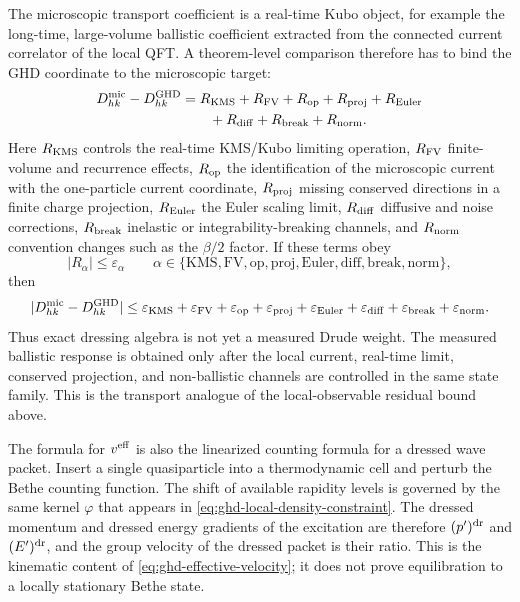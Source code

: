 \begin{remark}
The microscopic transport coefficient is a real-time Kubo object, for
example the long-time, large-volume ballistic coefficient extracted from the
connected current correlator of the local QFT.  A theorem-level comparison
therefore has to bind the GHD coordinate to the microscopic target:
\begin{equation}
\begin{aligned}
  D_{hk}^{\rm mic}-D_{hk}^{\rm GHD}
  &=
  R_{\rm KMS}
  +R_{\rm FV}
  +R_{\rm op}
  +R_{\rm proj}
  +R_{\rm Euler}  \\
  &\qquad
  +R_{\rm diff}
  +R_{\rm break}
  +R_{\rm norm}.
\end{aligned}
  \label{eq:ghd-drude-residual-decomposition}
\end{equation}
Here \(R_{\rm KMS}\) controls the real-time KMS/Kubo limiting operation,
\(R_{\rm FV}\) finite-volume and recurrence effects, \(R_{\rm op}\) the
identification of the microscopic current with the one-particle current
coordinate, \(R_{\rm proj}\) missing conserved directions in a finite charge
projection, \(R_{\rm Euler}\) the Euler scaling limit, \(R_{\rm diff}\)
diffusive and noise corrections, \(R_{\rm break}\) inelastic or
integrability-breaking channels, and \(R_{\rm norm}\) convention changes such
as the \(\beta/2\) factor.  If these terms obey
\[
  |R_\alpha|\le \varepsilon_\alpha
  \qquad
  \alpha\in
  \{\mathrm{KMS},\mathrm{FV},\mathrm{op},\mathrm{proj},
    \mathrm{Euler},\mathrm{diff},\mathrm{break},\mathrm{norm}\},
\]
then
\begin{equation}
  |D_{hk}^{\rm mic}-D_{hk}^{\rm GHD}|
  \le
  \varepsilon_{\rm KMS}
  +\varepsilon_{\rm FV}
  +\varepsilon_{\rm op}
  +\varepsilon_{\rm proj}
  +\varepsilon_{\rm Euler}
  +\varepsilon_{\rm diff}
  +\varepsilon_{\rm break}
  +\varepsilon_{\rm norm}.
  \label{eq:ghd-drude-residual-bound}
\end{equation}
Thus exact dressing algebra is not yet a measured Drude weight.  The measured
ballistic response is obtained only after the local current, real-time limit,
conserved projection, and non-ballistic channels are controlled in the same
state family.  This is the transport analogue of the local-observable
residual bound above.
\end{remark}

The formula for \(v^{\rm eff}\) is also the linearized counting formula for
a dressed wave packet.  Insert a single quasiparticle into a thermodynamic
cell and perturb the Bethe counting function.  The shift of available
rapidity levels is governed by the same kernel \(\varphi\) that appears in
\eqref{eq:ghd-local-density-constraint}.  The dressed momentum and dressed
energy gradients of the excitation are therefore \((p')^{\rm dr}\) and
\((E')^{\rm dr}\), and the group velocity of the dressed packet is their
ratio.  This is the kinematic content of
\eqref{eq:ghd-effective-velocity}; it does not prove equilibration to a
locally stationary Bethe state.

